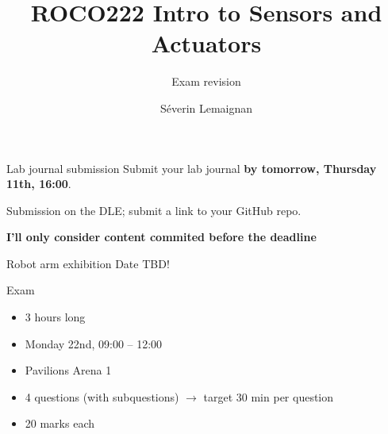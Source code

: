 \documentclass[compress]{beamer}
\title{ROCO222 \newline Intro to Sensors and Actuators}
\subtitle{Exam revision}
\date{}
\author{Séverin Lemaignan}
\institute{Centre for Neural Systems and Robotics\\{\bf Plymouth University}}
\makeatletter
\def\beamer@writeslidentry@miniframesoff{%
  \expandafter\beamer@ifempty\expandafter{\beamer@framestartpage}{}%
  {%
    \clearpage\beamer@notesactions%
  }
}
\newcommand*{\miniframesoff}{\let\beamer@writeslidentry=\beamer@writeslidentry@miniframesoff}
\makeatother
\begin{document}

\maketitle

\miniframesoff

\begin{frame}[plain]{}
    \begin{alertblock}{Lab journal submission}
        Submit your lab journal \textbf{by tomorrow, Thursday 11th, 16:00}.

        Submission on the DLE; submit a link to your GitHub repo.

        \textbf{I'll only consider content commited before the deadline}
    \end{alertblock}
\end{frame}

\begin{frame}{Robot arm exhibition}
    Date TBD!
\end{frame}

\begin{frame}{Exam}


    \begin{itemize}
        \item 3 hours long
        \item Monday 22nd, 09:00 – 12:00
        \item Pavilions Arena 1
    \end{itemize}

    \pause

    \begin{itemize}
        \item 4 questions (with subquestions) $\rightarrow$ target 30 min per
            question
        \item 20 marks each
    \end{itemize}


\end{frame}
\end{document}
